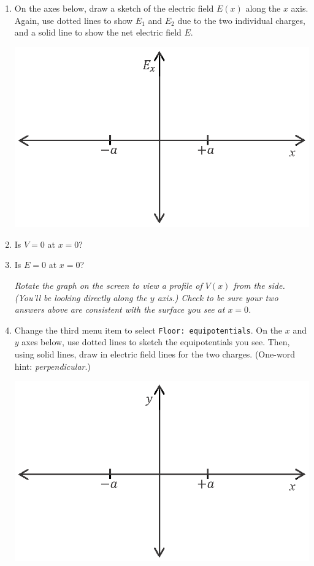 \begin{enumerate}[labparts]
\item On the axes below, draw a sketch of the electric field $E(x)$ along the $x$ axis.  Again, use dotted lines to show $E_1$ and $E_2$ due to the two individual charges, and a solid line to show the net electric field $E$.
\begin{center}
\includegraphics{potential_superposition/activity_2_3_figs/E_axes.eps}
\end{center}

\item Is $V=0$ at $x=0$?
\answerspace{0.3in}

\item Is $E=0$ at $x=0$?
\answerspace{0.3in}

\textit{Rotate the graph on the screen to view a profile of $V(x)$ from the side.  (You'll be looking directly along the $y$ axis.)  Check to be sure your two answers above are consistent with the surface you see at $x=0$.}

\item  Change the third menu item to select \verb!Floor: equipotentials!.  On the $x$ and $y$ axes below, use dotted lines to sketch the equipotentials you see.  Then, using solid lines, draw in electric field lines for the two charges.  (One-word hint: \textit{perpendicular}.)
\begin{center}
\includegraphics{potential_superposition/activity_2_3_figs/x_y_axes.eps}
\end{center}
\end{enumerate}
